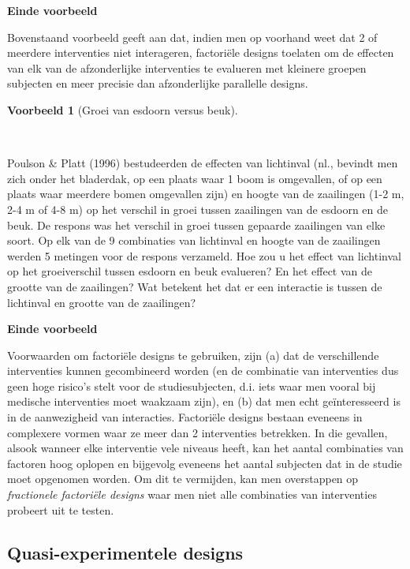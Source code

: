 \documentclass[
  dutch,
  letterpaper,
  12pt]{book}
\theoremstyle{definition}
\theoremstyle{definition}
\theoremstyle{definition}
\newtheorem{example}{Voorbeeld}[chapter]
\theoremstyle{remark}
\begin{document}
\textbf{Einde voorbeeld}

Bovenstaand voorbeeld geeft aan dat, indien men op voorhand weet dat 2
of meerdere interventies niet interageren, factoriële designs toelaten
om de effecten van elk van de afzonderlijke interventies te evalueren
met kleinere groepen subjecten en meer precisie dan afzonderlijke
parallelle designs.

\begin{example}[Groei van esdoorn versus
beuk]\protect\hypertarget{exm-groei-van-esdoorn-versus-beuk}{}\label{exm-groei-van-esdoorn-versus-beuk}

~

\end{example}

Poulson \& Platt (1996) bestudeerden de effecten van lichtinval (nl.,
bevindt men zich onder het bladerdak, op een plaats waar 1 boom is
omgevallen, of op een plaats waar meerdere bomen omgevallen zijn) en
hoogte van de zaailingen (1-2 m, 2-4 m of 4-8 m) op het verschil in
groei tussen zaailingen van de esdoorn en de beuk. De respons was het
verschil in groei tussen gepaarde zaailingen van elke soort. Op elk van
de 9 combinaties van lichtinval en hoogte van de zaailingen werden 5
metingen voor de respons verzameld. Hoe zou u het effect van lichtinval
op het groeiverschil tussen esdoorn en beuk evalueren? En het effect van
de grootte van de zaailingen? Wat betekent het dat er een interactie is
tussen de lichtinval en grootte van de zaailingen?

\textbf{Einde voorbeeld}

Voorwaarden om factoriële designs te gebruiken, zijn (a) dat de
verschillende interventies kunnen gecombineerd worden (en de combinatie
van interventies dus geen hoge risico's stelt voor de studiesubjecten,
d.i. iets waar men vooral bij medische interventies moet waakzaam zijn),
en (b) dat men echt geïnteresseerd is in de aanwezigheid van
interacties. Factoriële designs bestaan eveneens in complexere vormen
waar ze meer dan 2 interventies betrekken. In die gevallen, alsook
wanneer elke interventie vele niveaus heeft, kan het aantal combinaties
van factoren hoog oplopen en bijgevolg eveneens het aantal subjecten dat
in de studie moet opgenomen worden. Om dit te vermijden, kan men
overstappen op \emph{fractionele factoriële designs} waar men niet alle
combinaties van interventies probeert uit te testen.

\subsection{Quasi-experimentele
designs}\label{quasi-experimentele-designs}
\end{document}
